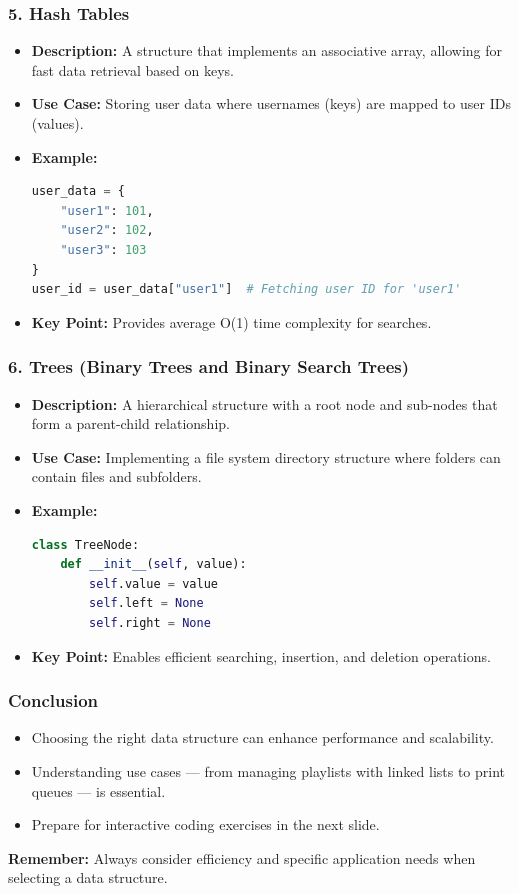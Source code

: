 \documentclass{beamer}
\begin{document}
\begin{frame}[fragile]
    \frametitle{5. Hash Tables}
    \begin{itemize}
        \item \textbf{Description:} A structure that implements an associative array, allowing for fast data retrieval based on keys.
        \item \textbf{Use Case:} Storing user data where usernames (keys) are mapped to user IDs (values).
        \item \textbf{Example:}
        \begin{lstlisting}[language=Python]
user_data = {
    "user1": 101,
    "user2": 102,
    "user3": 103
}
user_id = user_data["user1"]  # Fetching user ID for 'user1'
        \end{lstlisting}
        \item \textbf{Key Point:} Provides average O(1) time complexity for searches.
    \end{itemize}
\end{frame}

\begin{frame}[fragile]
    \frametitle{6. Trees (Binary Trees and Binary Search Trees)}
    \begin{itemize}
        \item \textbf{Description:} A hierarchical structure with a root node and sub-nodes that form a parent-child relationship.
        \item \textbf{Use Case:} Implementing a file system directory structure where folders can contain files and subfolders.
        \item \textbf{Example:}
        \begin{lstlisting}[language=Python]
class TreeNode:
    def __init__(self, value):
        self.value = value
        self.left = None
        self.right = None
        \end{lstlisting}
        \item \textbf{Key Point:} Enables efficient searching, insertion, and deletion operations.
    \end{itemize}
\end{frame}

\begin{frame}
    \frametitle{Conclusion}
    \begin{itemize}
        \item Choosing the right data structure can enhance performance and scalability.
        \item Understanding use cases — from managing playlists with linked lists to print queues — is essential.
        \item Prepare for interactive coding exercises in the next slide.
    \end{itemize}
    \textbf{Remember:} Always consider efficiency and specific application needs when selecting a data structure.
\end{frame}
\end{document}
